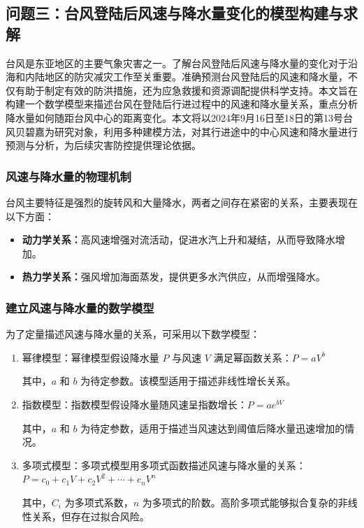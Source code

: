 \documentclass[withoutpreface,bwprint]{cumcmthesis}
\begin{document}
\newpage
\subsection{问题三：台风登陆后风速与降水量变化的模型构建与求解}

台风是东亚地区的主要气象灾害之一。了解台风登陆后风速与降水量的变化对于沿海和内陆地区的防灾减灾工作至关重要。准确预测台风登陆后的风速和降水量，不仅有助于制定有效的防洪措施，还为应急救援和资源调配提供科学支持。本文旨在构建一个数学模型来描述台风在登陆后行进过程中的风速和降水量关系，重点分析降水量如何随距台风中心的距离变化。本文将以2024年9月16日至18日的第13号台风贝碧嘉为研究对象，利用多种建模方法，对其行进途中的中心风速和降水量进行预测与分析，为后续灾害防控提供理论依据。


\subsubsection{风速与降水量的物理机制}

台风主要特征是强烈的旋转风和大量降水，两者之间存在紧密的关系，主要表现在以下方面：

\begin{itemize}
    \item \textbf{动力学关系：}高风速增强对流活动，促进水汽上升和凝结，从而导致降水增加。

    \item \textbf{热力学关系：}强风增加海面蒸发，提供更多水汽供应，从而增强降水。
\end{itemize}

\subsubsection{建立风速与降水量的数学模型}

为了定量描述风速与降水量的关系，可采用以下数学模型：

\begin{enumerate}
    \item[(1)] 幂律模型：幂律模型假设降水量 $P$ 与风速 $V$ 满足幂函数关系：$P = a V^b$
               
               其中，$a$ 和 $b$ 为待定参数。该模型适用于描述非线性增长关系。

    \item[(2)] 指数模型：指数模型假设降水量随风速呈指数增长：$P = a e^{bV}$
               
               其中，$a$ 和 $b$ 为待定参数，适用于描述当风速达到阈值后降水量迅速增加的情况。

    \item[(3)] 多项式模型：多项式模型用多项式函数描述风速与降水量的关系：$P = c_0 + c_1 V +              c_2 V^2 + \cdots + c_n V^n$
               
               其中，$C_i$ 为多项式系数，$n$ 为多项式的阶数。高阶多项式能够拟合复杂的非线性关系，但存在过拟合风险。
\end{enumerate}
\end{document}
